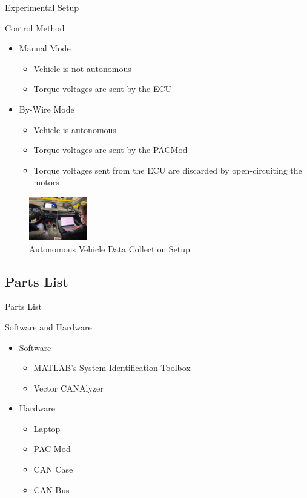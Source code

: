 \documentclass{beamer}
\begin{document}
\begin{frame}{Experimental Setup}
	\begin{block}{Control Method}
		\begin{itemize}
			\item Manual Mode
			\begin{itemize}
				\item Vehicle is not autonomous
				\item Torque voltages are sent by the ECU
			\end{itemize}
			\item By-Wire Mode
			\begin{itemize}
				\item Vehicle is autonomous
				\item Torque voltages are sent by the PACMod
				\item Torque voltages sent from the ECU are discarded by open-circuiting the motors
			\end{itemize}
		\end{itemize}
		\begin{figure}
			\centering
    			\captionsetup{justification=centering, margin=3cm}
    			\includegraphics[width=1in]{figs/img/picturesVisitToAStuff/dataColletionSetup1-20211007}
    			\caption{Autonomous Vehicle Data Collection Setup}
    			\label{fig:vehicleSetup}
		\end{figure}
	\end{block}
\end{frame}

\subsection{Parts List}

\begin{frame}{Parts List}
  \begin{block}{Software and Hardware}
 \begin{itemize}
        \item Software
        \begin{itemize}
        \small
        \item MATLAB's System Identification Toolbox
        \item Vector CANAlyzer
        \end{itemize}
	\item Hardware
	\begin{itemize}
	\small
	\item Laptop
	\item PAC Mod
	\item CAN Case 
	\item CAN Bus
	\end{itemize}
\end{itemize}
  \end{block}
\end{frame}
\end{document}
